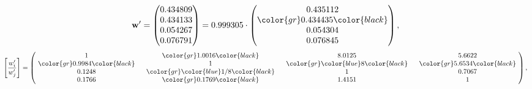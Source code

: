 \begin{example}
\begin{equation*}
\mathbf{w}^{\prime} =
\begin{pmatrix}
0.434809\\
0.434133\\
0.054267\\
0.076791
\end{pmatrix} =
0.999305\cdot
\begin{pmatrix}
0.435112\\
\color{gr} 0.434435\color{black} \\
0.054304\\
0.076845
\end{pmatrix},
\end{equation*}
\begin{equation*}
\left[ \frac{{w}^{\prime}_i}{{w}^{\prime}_j} \right] =
\begin{pmatrix}
$\,\,$ 1 $\,\,$ & $\,\,$\color{gr} 1.0016\color{black} $\,\,$ & $\,\,$8.0125$\,\,$ & $\,\,$5.6622$\,\,$ \\
$\,\,$\color{gr} 0.9984\color{black} $\,\,$ & $\,\,$ 1 $\,\,$ & $\,\,$\color{gr} \color{blue} 8\color{black} $\,\,$ & $\,\,$\color{gr} 5.6534\color{black}   $\,\,$ \\
$\,\,$0.1248$\,\,$ & $\,\,$\color{gr} \color{blue}  1/8\color{black} $\,\,$ & $\,\,$ 1 $\,\,$ & $\,\,$0.7067 $\,\,$ \\
$\,\,$0.1766$\,\,$ & $\,\,$\color{gr} 0.1769\color{black} $\,\,$ & $\,\,$1.4151$\,\,$ & $\,\,$ 1  $\,\,$ \\
\end{pmatrix},
\end{equation*}
\end{example}
\newpage

